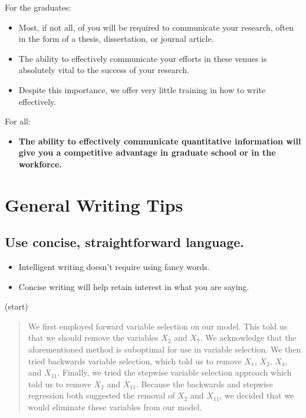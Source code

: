 \documentclass[12pt]{notes}
\begin{document}
For the graduates: 
\begin{itemize}
\item Most, if not all, of you will be required to communicate your research, often in the form of a thesis, dissertation, or journal article. 
\item The ability to effectively communicate your efforts in these venues is absolutely vital to the success of your research. 
\item Despite this importance, we offer very little training in how to write effectively. 
\end{itemize}

For all:
\begin{itemize}
\item \textbf{The ability to effectively communicate quantitative information will give you a competitive advantage in graduate school or in the workforce.} 
\end{itemize}

\section{General Writing Tips}

\subsection*{Use concise, straightforward language.}
\begin{itemize}
\item Intelligent writing doesn't require using fancy words. 
\item Concise writing will help retain interest in what you are saying. 
\end{itemize}

(start)
\begin{quote}
We first employed forward variable selection on our model. This told us that we should remove the variables $X_2$ and $X_7$. We acknowledge that the aforementioned method is suboptimal for use in variable selection. We then tried backwards variable selection, which told us to remove $X_1$, $X_2$, $X_4$, and $X_{11}.$ Finally, we tried the stepwise variable selection approach which told us to remove $X_2$ and $X_{11}$. Because the backwards and stepwise regression both suggested the removal of $X_2$ and $X_{11}$, we decided that we would eliminate these variables from our model. 
\end{quote}
\end{document}
